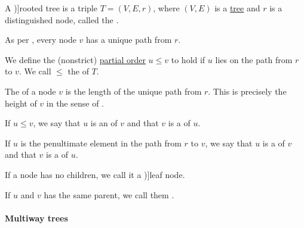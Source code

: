 \begin{definition}\label{def:rooted_tree}
  A \term[ru=корневое дерево (\cite[37]{Карпов2017})]{rooted tree} is a triple \( T = (V, E, r) \), where \( (V, E) \) is a \hyperref[def:tree]{tree} and \( r \) is a distinguished node, called the .

  As per , every node \( v \) has a unique path from \( r \).

  \begin{thmenum}
     We define the (nonstrict) \hyperref[def:partially_ordered_set]{partial order} \( u \leq v \) to hold if \( u \) lies on the path from \( r \) to \( v \). We call \( \leq \) the  of \( T \).

     The  of a node \( v \) is the length of the unique path from \( r \). This is precisely the height of \( v \) in the sense of .

     If \( u \leq v \), we say that \( u \) is an  of \( v \) and that \( v \) is a  of \( u \).

     If \( u \) is the penultimate element in the path from \( r \) to \( v \), we say that \( u \) is a  of \( v \) and that \( v \) is a  of \( u \).

     If a node has no children, we call it a \term[ru=лист (\cite[25]{Карпов2017})]{leaf node}.

     If \( u \) and \( v \) has the same parent, we call them .
  \end{thmenum}
\end{definition}

\paragraph{Multiway trees}

